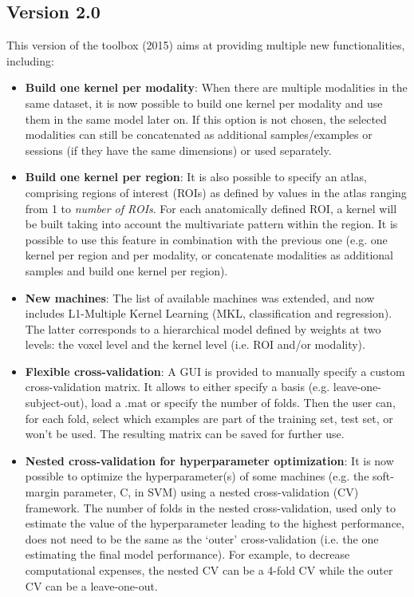 \subsection{Version 2.0}
This version of the toolbox (2015) aims at providing multiple new functionalities, including:
\begin{itemize}
\item \textbf{Build one kernel per modality}: When there are multiple modalities in the same dataset, it is now possible to build one kernel per modality and use them in the same model later on. If this option is not chosen, the selected modalities can still be concatenated as additional samples/examples or sessions (if they have the same dimensions) or used separately.
\item \textbf{Build one kernel per region}: It is also possible to specify an atlas, comprising regions of interest (ROIs) as defined by values in the atlas ranging from 1 to \textit{number of ROIs}. For each anatomically defined ROI, a kernel will be built taking into account the multivariate pattern within the region. It is possible to use this feature in combination with the previous one (e.g. one kernel per region and per modality, or concatenate modalities as additional samples and build one kernel per region).
\item \textbf{New machines}: The list of available machines was extended, and now includes L1-Multiple Kernel Learning (MKL, classification and regression). The latter corresponds to a hierarchical model defined by weights at two levels: the voxel level and the kernel level (i.e. ROI and/or modality).
\item \textbf{Flexible cross-validation}: A GUI is provided to manually specify a custom cross-validation matrix. It allows to either specify a basis (e.g. leave-one-subject-out), load a .mat or specify the number of folds. Then the user can, for each fold, select which examples are part of the training set, test set, or won't be used. The resulting matrix can be saved for further use.
\item \textbf{Nested cross-validation for hyperparameter optimization}: It is now possible to optimize the hyperparameter(s) of some machines (e.g. the soft-margin parameter, C, in SVM) using a nested cross-validation (CV) framework. The number of folds in the nested cross-validation, used only to estimate the value of the hyperparameter leading to the highest performance, does not need to be the same as the `outer' cross-validation (i.e. the one estimating the final model performance). For example, to decrease computational expenses, the nested CV can be a 4-fold CV while the outer CV can be a leave-one-out.

\end{itemize}
